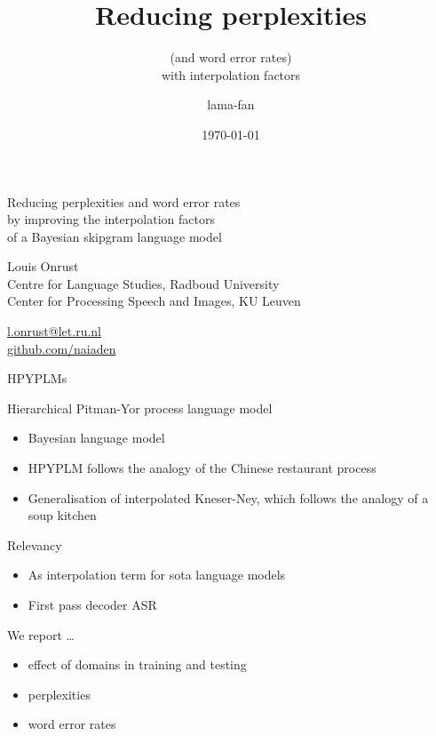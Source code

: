 \documentclass[department=cls, grouplogo=lama, notes={hide notes}, slidesperpage=1, official=true]{beamerruhuisstijl}
\title{Reducing perplexities}
\subtitle{\hspace*{4cm}(and word error rates) \\ \hspace*{6cm} with interpolation factors}
\date{\today}
\author{lama-fan}
\begin{document}
\begin{frame}
    \titlepage
\end{frame}
\note{
}

\begin{frame}{Reducing perplexities and word error rates \\ by improving the interpolation factors \\ of a Bayesian skipgram language model}
    \begin{block}{}
        Louis Onrust \\
        Centre for Language Studies, Radboud University \\
        Center for Processing Speech and Images, KU Leuven
    \end{block}

    \begin{block}{}
        \href{mailto:l.onrust@let.ru.nl}{l.onrust@let.ru.nl} \\
        \href{https://github.com/naiaden}{github.com/naiaden}
    \end{block}
\end{frame}
\note{
}

\begin{frame}{HPYPLMs}
\begin{block}{Hierarchical Pitman-Yor process language model}
\begin{itemize}
    \item Bayesian language model
    \item HPYPLM follows the analogy of the Chinese restaurant process
    \item Generalisation of interpolated Kneser-Ney, which follows the analogy of a soup kitchen
\end{itemize}
\end{block}

\begin{block}{Relevancy}
    \begin{itemize}
        \item As interpolation term for sota language models
        \item First pass decoder ASR
    \end{itemize}
\end{block}

\begin{block}{We report \ldots}
\begin{itemize}
    \item effect of domains in training and testing
    \item perplexities
    \item word error rates
    \end{itemize}
\end{block}
\end{frame}
\end{document}
